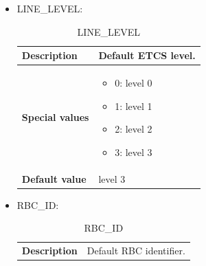 \documentclass{template/openetcs}
\begin{document}
	\begin{itemize}
		\item LINE\_LEVEL:
		
			\begin{longtable}{|l|l|}
				\caption{LINE\_LEVEL}\\ 
				\hline
				
					\begin{minipage}[t]{0.22\linewidth} \textbf{Description}	\end{minipage} 
				&	\begin{minipage}[t]{0.78\linewidth} Default ETCS level. \end{minipage} \\
				
				\hline
																																									
					\begin{minipage}[t]{0.22\linewidth} \textbf{Special values}	\end{minipage} 
				&	\begin{minipage}[t]{0.78\linewidth} \begin{itemize} \item 0: level 0 \item 1: level 1 \item 2: level 2 \item 3: level 3 \end{itemize} \end{minipage} \\
				
				\hline
				
					\begin{minipage}[t]{0.22\linewidth} \textbf{Default value}	\end{minipage} 
				&	\begin{minipage}[t]{0.78\linewidth} level 3 \end{minipage} \\
				
				\hline
				
			\end{longtable}
			
		\item RBC\_ID:
				
			\begin{longtable}{|l|l|}
				\caption{RBC\_ID}\\ 
				\hline
				
					\begin{minipage}[t]{0.22\linewidth} \textbf{Description}	\end{minipage} 
				&	\begin{minipage}[t]{0.78\linewidth} Default RBC identifier. \end{minipage} \\
				

\end{longtable}
\end{itemize}
\end{document}
